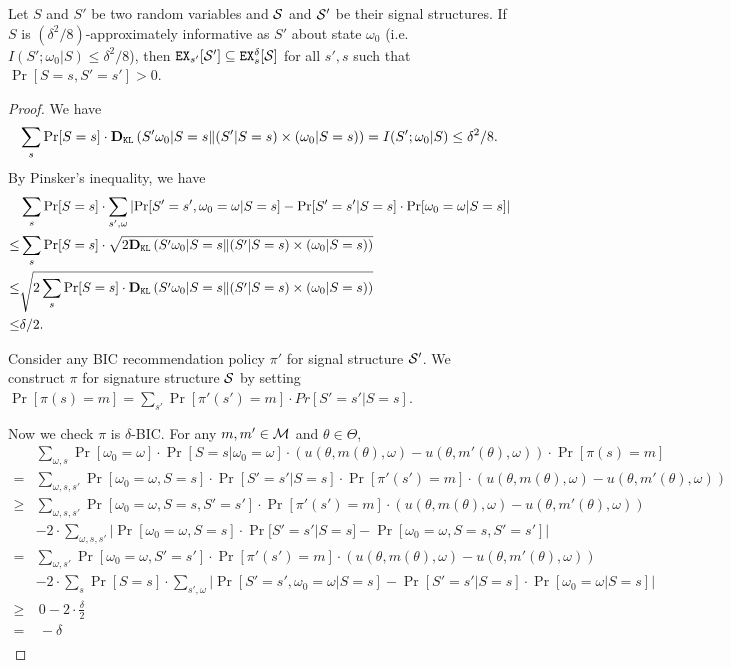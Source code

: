 \begin{lemma}
\label{lem:ainfomono}
Let $S$ and $S'$ be two random variables and $\S$ and $\S'$ be their signal structures. If $S$ is $(\delta^2/8)$-approximately informative as $S'$ about state $\omega_0$ (i.e. $I(S' ; \omega_0|S) \leq \delta^2/8$), then $\EX_{s'}[\S'] \subseteq \EX^{\delta}_s[\S]$  for all $s' ,s$ such that $\Pr[S= s, S'= s'] > 0$.
\end{lemma}

\begin{proof}
We have
\[
\sum_{s} \Pr[S=s] \cdot \DKL\left(S'\omega_0|S=s \| (S'|S=s) \times (\omega_0|S=s) \right) = I(S' ; \omega_0|S) \leq \delta^2/8.
\]
By Pinsker's inequality, we have
\begin{align*}
       &\sum_{s} \Pr[S = s] \cdot  \sum_{s', \omega} \left| \Pr[S' = s', \omega_0 = \omega| S= s] - \Pr[S'=s'|S=s] \cdot \Pr[\omega_0 = \omega|S=s]\right| \\
\leq & \sum_{s} \Pr[S=s] \cdot \sqrt{2 \DKL\left(S'\omega_0|S=s \| (S'|S=s) \times (\omega_0|S=s) \right)  } \\
\leq &  \sqrt{2 \sum_{s} \Pr[S=s] \cdot  \DKL\left(S'\omega_0|S=s \| (S'|S=s) \times (\omega_0|S=s) \right) } \\
\leq &\delta /2. \\
\end{align*}

Consider any BIC recommendation policy $\pi'$ for signal structure $\S'$. We construct $\pi$ for signature structure $\S$ by setting $\Pr[\pi(s) = m] = \sum_{s'} \Pr[\pi'(s') = m] \cdot Pr[S' = s'|S = s]$.

Now we check $\pi$ is $\delta$-BIC. For any $m,m' \in \M$ and $\theta \in \varTheta$,
\begin{align*}
& \sum_{\omega,s} \Pr[\omega_0= \omega] \cdot \Pr[S = s | \omega_0 = \omega] \cdot \left(u(\theta, m(\theta), \omega) - u(\theta, m'(\theta), \omega)\right) \cdot  \Pr[\pi(s) = m] \\
=&\sum_{\omega,s,s'} \Pr[\omega_0 = \omega, S = s] \cdot \Pr[ S'=s'|S= s] \cdot \Pr[\pi'(s') = m]   \cdot \left(u(\theta, m(\theta), \omega) - u(\theta, m'(\theta), \omega)\right)\\
\geq &\sum_{\omega,s,s'} \Pr[\omega_0 = \omega, S = s, S'=s'] \cdot \Pr[\pi'(s') = m]   \cdot \left(u(\theta, m(\theta), \omega) - u(\theta, m'(\theta),
 \omega)\right)\\
& -2 \cdot \sum_{\omega,s,s'} | \Pr[\omega_0 = \omega, S = s] \cdot \Pr[ S'=s'|S= s] -  \Pr[\omega_0 = \omega, S = s, S'=s']| \\
= &\sum_{\omega,s'} \Pr[\omega_0 = \omega, S'=s'] \cdot \Pr[\pi'(s') = m]   \cdot \left(u(\theta, m(\theta), \omega) - u(\theta, m'(\theta),
 \omega)\right)\\
& -2 \cdot \sum_{s} \Pr[S = s] \cdot  \sum_{s', \omega} \left| \Pr[S' = s', \omega_0 = \omega| S= s] - \Pr[S'=s'|S=s] \cdot \Pr[\omega_0 = \omega|S=s]\right| \\
\geq&  ~0- 2 \cdot \frac{\delta}{2}\\
 =& ~-\delta\\
\end{align*}


\end{proof}
